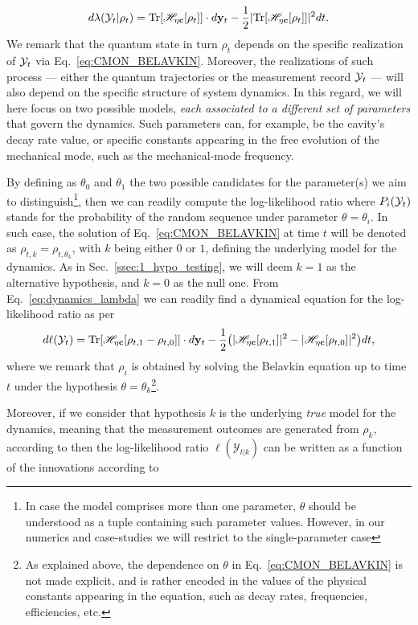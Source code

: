 \begin{align}\label{eq:dynamics_lambda}
d\lambda(\mathcal{Y}_t|\rho_t) = \text{Tr}[\mathscr{H}_{\mathbf{\eta}\mathbf{c}}[\rho_t]]\cdot d\mathbf{y}_t - \frac{1}{2} |\text{Tr}[\mathscr{H}_{\mathbf{\eta}\mathbf{c}}[\rho_t]]|^2 dt.
\end{align}
We remark that the quantum state in turn $\rho_t$ depends on the specific realization of $\mathcal{Y}_t$ via Eq.~\eqref{eq:CMON_BELAVKIN}. Moreover, the realizations of such process --- either the quantum trajectories or the measurement record $\mathcal{Y}_t$ --- will also depend on the specific structure of system dynamics. In this regard, we will here focus on two possible models, \textit{each associated to a different set of parameters} that govern the dynamics. Such parameters can, for example, be the cavity's decay rate value, or specific constants appearing in the free evolution of the mechanical mode, such as the mechanical-mode frequency.

By defining as $\theta_0$ and $\theta_1$ the two possible candidates for the parameter(s) we aim to distinguish\footnote{In case the model comprises more than one parameter, $\theta$ should be understood as a tuple containing such parameter values. However, in our numerics and case-studies we will restrict to the single-parameter case}, then we can readily compute the log-likelihood ratio
where $P_i(\mathcal{Y}_t)$ stands for the probability of the random sequence under parameter $\theta = \theta_i$. In such case, the solution of Eq.~\ref{eq:CMON_BELAVKIN} at time $t$ will be denoted as $\rho_{t,k} = \rho_{t,\theta_k}$, with $k$ being either $0$ or $1$,  defining the underlying model for the dynamics. As in Sec.~\ref{ssec:1_hypo_testing}, we will deem $k=1$
as the alternative hypothesis, and $k=0$ as the null one. From Eq.~\ref{eq:dynamics_lambda} we can readily find a dynamical equation for the log-likelihood ratio as per
\begin{align}
d\ell(\mathcal{Y}_t) = \text{Tr}[\mathscr{H}_{\mathbf{\eta}\mathbf{c}}[\rho_{t,1} - \rho_{t,0}]]\cdot d\mathbf{y}_t - \frac{1}{2}\big(|\mathscr{H}_{\mathbf{\eta}\mathbf{c}}[\rho_{t,1}]|^2 - |\mathscr{H}_{\mathbf{\eta}\mathbf{c}}[\rho_{t,0}]|^2 \big) dt,
\end{align}
where we remark that $\rho_i$ is obtained by solving the Belavkin equation up to time $t$ under the hypothesis $\theta = \theta_k$\footnote{As explained above, the dependence on $\theta$ in Eq.~\ref{eq:CMON_BELAVKIN} is not made explicit, and is rather encoded in the values of the physical constants appearing in the equation, such as decay rates, frequencies, efficiencies, etc.}.

Moreover, if we consider that hypothesis $k$ is the underlying \textit{true} model for the dynamics, meaning that the measurement outcomes are generated from $\rho_k$, according to
then the log-likelihood ratio $\ell(\mathcal{Y}_{t|k})$ can be written as a function of the innovations according to

